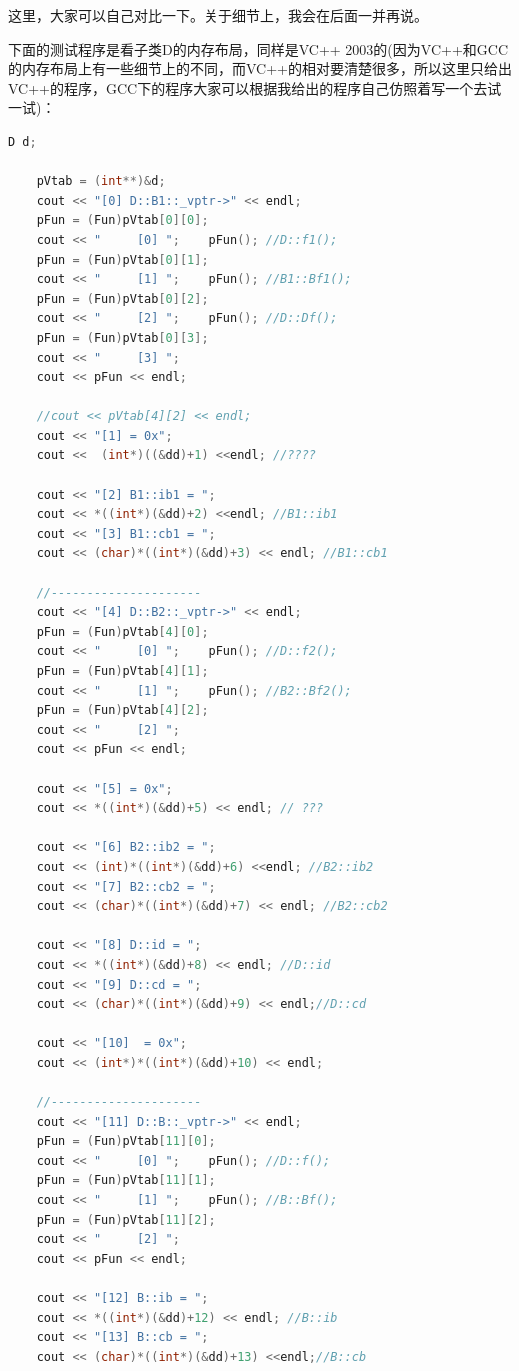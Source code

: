 \documentclass{article}
\begin{document}
\begin{CJK}{UTF8}{gbsn}
这里，大家可以自己对比一下。关于细节上，我会在后面一并再说。
 
下面的测试程序是看子类D的内存布局，同样是VC++ 2003的(因为VC++和GCC的内存布局上有一些细节上的不同，而VC++的相对要清楚很多，所以这里只给出VC++的程序，GCC下的程序大家可以根据我给出的程序自己仿照着写一个去试一试)：
\begin{lstlisting}[language=c++]
    D d;
 
    pVtab = (int**)&d;
    cout << "[0] D::B1::_vptr->" << endl;
    pFun = (Fun)pVtab[0][0];
    cout << "     [0] ";    pFun(); //D::f1();
    pFun = (Fun)pVtab[0][1];
    cout << "     [1] ";    pFun(); //B1::Bf1();
    pFun = (Fun)pVtab[0][2];
    cout << "     [2] ";    pFun(); //D::Df();
    pFun = (Fun)pVtab[0][3];
    cout << "     [3] ";
    cout << pFun << endl;
 
    //cout << pVtab[4][2] << endl;
    cout << "[1] = 0x";
    cout <<  (int*)((&dd)+1) <<endl; //????
 
    cout << "[2] B1::ib1 = ";
    cout << *((int*)(&dd)+2) <<endl; //B1::ib1
    cout << "[3] B1::cb1 = ";
    cout << (char)*((int*)(&dd)+3) << endl; //B1::cb1
 
    //---------------------
    cout << "[4] D::B2::_vptr->" << endl;
    pFun = (Fun)pVtab[4][0];
    cout << "     [0] ";    pFun(); //D::f2();
    pFun = (Fun)pVtab[4][1];
    cout << "     [1] ";    pFun(); //B2::Bf2();
    pFun = (Fun)pVtab[4][2];
    cout << "     [2] ";
    cout << pFun << endl;
   
    cout << "[5] = 0x";
    cout << *((int*)(&dd)+5) << endl; // ???
 
    cout << "[6] B2::ib2 = ";
    cout << (int)*((int*)(&dd)+6) <<endl; //B2::ib2
    cout << "[7] B2::cb2 = ";
    cout << (char)*((int*)(&dd)+7) << endl; //B2::cb2
 
    cout << "[8] D::id = ";
    cout << *((int*)(&dd)+8) << endl; //D::id
    cout << "[9] D::cd = ";
    cout << (char)*((int*)(&dd)+9) << endl;//D::cd
 
    cout << "[10]  = 0x";
    cout << (int*)*((int*)(&dd)+10) << endl;

    //---------------------
    cout << "[11] D::B::_vptr->" << endl;
    pFun = (Fun)pVtab[11][0];
    cout << "     [0] ";    pFun(); //D::f();
    pFun = (Fun)pVtab[11][1];
    cout << "     [1] ";    pFun(); //B::Bf();
    pFun = (Fun)pVtab[11][2];
    cout << "     [2] ";
    cout << pFun << endl;
 
    cout << "[12] B::ib = ";
    cout << *((int*)(&dd)+12) << endl; //B::ib
    cout << "[13] B::cb = ";
    cout << (char)*((int*)(&dd)+13) <<endl;//B::cb
\end{lstlisting}


\end{CJK}
\end{document}
